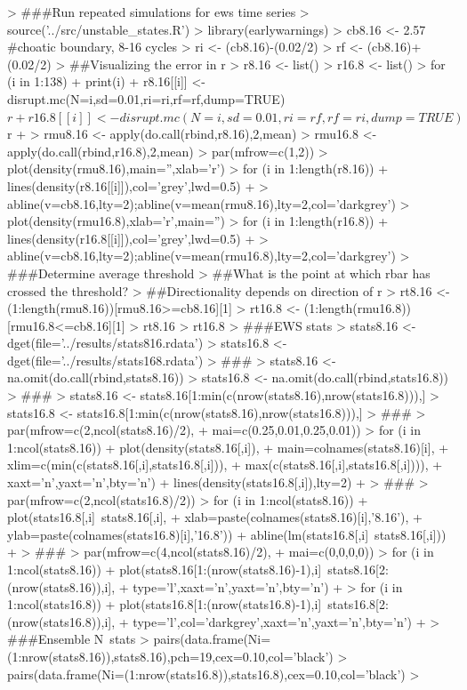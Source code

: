 \documentclass[12pt]{article}
\begin{document}
\begin{Schunk}
\begin{Sinput}
> ###Run repeated simulations for ews time series
> source('../src/unstable_states.R')
> library(earlywarnings)
> cb8.16 <- 2.57 #choatic boundary, 8-16 cycles
> ri <- (cb8.16)-(0.02/2)
> rf <- (cb8.16)+(0.02/2)
> ##Visualizing the error in r
> r8.16 <- list()
> r16.8 <- list()
> for (i in 1:138){
+   print(i)
+   r8.16[[i]] <- disrupt.mc(N=i,sd=0.01,ri=ri,rf=rf,dump=TRUE)$r
+   r16.8[[i]] <- disrupt.mc(N=i,sd=0.01,ri=rf,rf=ri,dump=TRUE)$r
+ }
> rmu8.16 <- apply(do.call(rbind,r8.16),2,mean)
> rmu16.8 <- apply(do.call(rbind,r16.8),2,mean)
> par(mfrow=c(1,2))
> plot(density(rmu8.16),main='',xlab='r')
> for (i in 1:length(r8.16)){
+   lines(density(r8.16[[i]]),col='grey',lwd=0.5)
+ }
> abline(v=cb8.16,lty=2);abline(v=mean(rmu8.16),lty=2,col='darkgrey')
> plot(density(rmu16.8),xlab='r',main='')
> for (i in 1:length(r16.8)){
+   lines(density(r16.8[[i]]),col='grey',lwd=0.5)
+ }
> abline(v=cb8.16,lty=2);abline(v=mean(rmu16.8),lty=2,col='darkgrey')
> ###Determine average threshold
> ##What is the point at which rbar has crossed the threshold?
> ##Directionality depends on direction of r
> rt8.16 <- (1:length(rmu8.16))[rmu8.16>=cb8.16][1]
> rt16.8 <- (1:length(rmu16.8))[rmu16.8<=cb8.16][1]
> rt8.16
> rt16.8
> ###EWS stats
> stats8.16 <- dget(file='../results/stats816.rdata')
> stats16.8 <- dget(file='../results/stats168.rdata')
> ###
> stats8.16 <- na.omit(do.call(rbind,stats8.16))
> stats16.8 <- na.omit(do.call(rbind,stats16.8))
> ###
> stats8.16 <- stats8.16[1:min(c(nrow(stats8.16),nrow(stats16.8))),]
> stats16.8 <- stats16.8[1:min(c(nrow(stats8.16),nrow(stats16.8))),]
> ###
> par(mfrow=c(2,ncol(stats8.16)/2),
+     mai=c(0.25,0.01,0.25,0.01))
> for (i in 1:ncol(stats8.16)){
+   plot(density(stats8.16[,i]),
+        main=colnames(stats8.16)[i],
+        xlim=c(min(c(stats8.16[,i],stats16.8[,i])),
+          max(c(stats8.16[,i],stats16.8[,i]))),
+        xaxt='n',yaxt='n',bty='n')
+   lines(density(stats16.8[,i]),lty=2)
+ }
> ###
> par(mfrow=c(2,ncol(stats16.8)/2))
> for (i in 1:ncol(stats8.16)){
+   plot(stats16.8[,i]~stats8.16[,i],
+        xlab=paste(colnames(stats8.16)[i],'8.16'),
+        ylab=paste(colnames(stats16.8)[i],'16.8'))
+   abline(lm(stats16.8[,i]~stats8.16[,i]))
+ }
> ###
> par(mfrow=c(4,ncol(stats8.16)/2),
+     mai=c(0,0,0,0))
> for (i in 1:ncol(stats8.16)){
+   plot(stats8.16[1:(nrow(stats8.16)-1),i]~stats8.16[2:(nrow(stats8.16)),i],
+        type='l',xaxt='n',yaxt='n',bty='n')
+ }
> for (i in 1:ncol(stats16.8)){
+   plot(stats16.8[1:(nrow(stats16.8)-1),i]~stats16.8[2:(nrow(stats16.8)),i],
+        type='l',col='darkgrey',xaxt='n',yaxt='n',bty='n')
+ }
> ###Ensemble N~stats
> pairs(data.frame(Ni=(1:nrow(stats8.16)),stats8.16),pch=19,cex=0.10,col='black')
> pairs(data.frame(Ni=(1:nrow(stats16.8)),stats16.8),cex=0.10,col='black')
> 
\end{Sinput}
\end{Schunk}
\end{document}

